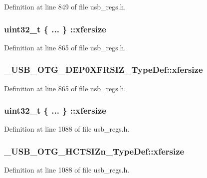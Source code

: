 Definition at line 849 of file usb\-\_\-regs.\-h.

\hypertarget{group___u_s_b___o_t_g___d_r_i_v_e_r_gaeadaad20e7a7405af936ef191e7280ea}{
\subsubsection[{xfersize}]{\setlength{\rightskip}{0pt plus 5cm}uint32\-\_\-t \{ ... \} \-::xfersize}}\label{group___u_s_b___o_t_g___d_r_i_v_e_r_gaeadaad20e7a7405af936ef191e7280ea}


Definition at line 865 of file usb\-\_\-regs.\-h.

\hypertarget{group___u_s_b___o_t_g___d_r_i_v_e_r_gab17c78134e88fbefa976bb6f780c52f4}{
\subsubsection[{xfersize}]{ \-\_\-\-U\-S\-B\-\_\-\-O\-T\-G\-\_\-\-D\-E\-P0\-X\-F\-R\-S\-I\-Z\-\_\-\-Type\-Def\-::xfersize}}\label{group___u_s_b___o_t_g___d_r_i_v_e_r_gab17c78134e88fbefa976bb6f780c52f4}


Definition at line 865 of file usb\-\_\-regs.\-h.

\hypertarget{group___u_s_b___o_t_g___d_r_i_v_e_r_ga964f5aea14353a04247becc26ef7eee9}{
\subsubsection[{xfersize}]{\setlength{\rightskip}{0pt plus 5cm}uint32\-\_\-t \{ ... \} \-::xfersize}}\label{group___u_s_b___o_t_g___d_r_i_v_e_r_ga964f5aea14353a04247becc26ef7eee9}


Definition at line 1088 of file usb\-\_\-regs.\-h.

\hypertarget{group___u_s_b___o_t_g___d_r_i_v_e_r_ga3ad5a80edb18c6fc8ebe2a9979caac3d}{
\subsubsection[{xfersize}]{ \-\_\-\-U\-S\-B\-\_\-\-O\-T\-G\-\_\-\-H\-C\-T\-S\-I\-Zn\-\_\-\-Type\-Def\-::xfersize}}\label{group___u_s_b___o_t_g___d_r_i_v_e_r_ga3ad5a80edb18c6fc8ebe2a9979caac3d}


Definition at line 1088 of file usb\-\_\-regs.\-h.

